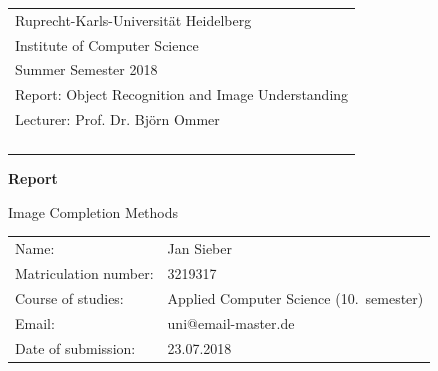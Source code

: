 \documentclass[
     11pt,         %
     a4paper,      %
     oneside,
     ]{article}
\makeatletter
\newcommand{\mytitle}{Image Completion Methods}
\newcommand{\myauthor}{Jan Sieber}
\newcommand{\myseminar}{Object Recognition and Image Understanding}
\newcommand{\mysemester}{Summer Semester 2018}
\newcommand{\mydozent}{Prof. Dr. Björn Ommer}
\newcommand{\mydozentTwo}{}
\newcommand{\mydozentThree}{}
\newcommand{\mydozentFour}{}
\newcommand{\mydozentFive}{}
\newcommand{\myMatrikelnummer}{3219317}
\newcommand{\myStudiengang}{Applied Computer Science }
\newcommand{\mySemester}{10}
\newcommand{\myEmail}{uni@email-master.de}
\newcommand{\generalDate}{23.07.2018}
\makeatother
\begin{document}
\begin{titlepage}
\begin{tabular}[l]{l}
Ruprecht-Karls-Universität Heidelberg\\
Institute of Computer Science\\
\mysemester\\
Report: \myseminar\\
Lecturer: \mydozent\\
\phantom{Dozenten: }\mydozentTwo\\
\phantom{Dozenten: }\mydozentThree\\
\phantom{Dozenten: }\mydozentFour\\
\phantom{Dozenten: }\mydozentFive\\
\end{tabular}

\vspace{4cm}
\begin{center}
\textbf{\large Report} %
\vspace{0.5\baselineskip}

{\huge
\mytitle
}
\end{center}

\vfill
\begin{tabular}[l]{ll}
Name:           & \myauthor\\
Matriculation number: & \myMatrikelnummer\\
Course of studies:    & \myStudiengang (\mySemester.\ semester)\\
Email: & \myEmail\\
Date of submission: & \generalDate \\
\end{tabular}

\end{titlepage}

\onehalfspacing



\hspace*{-1.5in}

\thispagestyle{empty}
\end{document}
